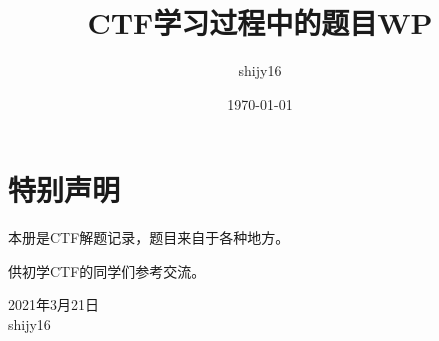 \documentclass[cn,11pt,chinese]{elegantbook}
\title{CTF学习过程中的题目WP}
\author{shijy16}
\date{\today}
\begin{document}
\maketitle

\chapter*{特别声明}

本册是CTF解题记录，题目来自于各种地方。

供初学CTF的同学们参考交流。

\vskip 1.5cm

\begin{flushright}
2021年3月21日\\
shijy16
\end{flushright}


\tableofcontents
\setcounter{page}{1}



\end{document}
